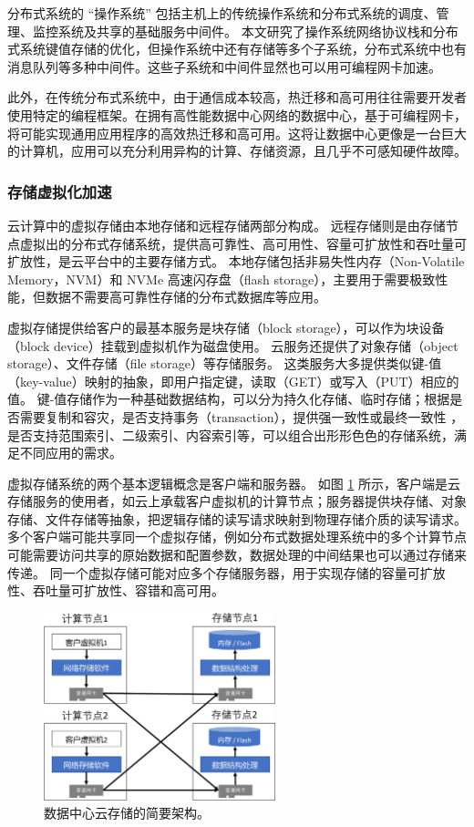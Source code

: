 分布式系统的 ``操作系统'' 包括主机上的传统操作系统和分布式系统的调度、管理、监控系统及共享的基础服务中间件。
本文研究了操作系统网络协议栈和分布式系统键值存储的优化，但操作系统中还有存储等多个子系统，分布式系统中也有消息队列等多种中间件。这些子系统和中间件显然也可以用可编程网卡加速。

此外，在传统分布式系统中，由于通信成本较高，热迁移和高可用往往需要开发者使用特定的编程框架。在拥有高性能数据中心网络的数据中心，基于可编程网卡，将可能实现通用应用程序的高效热迁移和高可用。这将让数据中心更像是一台巨大的计算机，应用可以充分利用异构的计算、存储资源，且几乎不可感知硬件故障。

\subsubsection{存储虚拟化加速}
\label{future:storage-virtualization}

云计算中的虚拟存储由本地存储和远程存储两部分构成。
远程存储则是由存储节点虚拟出的分布式存储系统，提供高可靠性、高可用性、容量可扩放性和吞吐量可扩放性，是云平台中的主要存储方式。
本地存储包括非易失性内存（Non-Volatile Memory，NVM）和 NVMe 高速闪存盘（flash storage），主要用于需要极致性能，但数据不需要高可靠性存储的分布式数据库等应用。

虚拟存储提供给客户的最基本服务是块存储（block storage），可以作为块设备（block device）挂载到虚拟机作为磁盘使用。
云服务还提供了对象存储（object storage）、文件存储（file storage）等存储服务。
这类服务大多提供类似键-值（key-value）映射的抽象，即用户指定键，读取（GET）或写入（PUT）相应的值。
键-值存储作为一种基础数据结构，可以分为持久化存储、临时存储；根据是否需要复制和容灾，是否支持事务（transaction），提供强一致性或最终一致性 \cite{anna}，是否支持范围索引、二级索引、内容索引等，可以组合出形形色色的存储系统，满足不同应用的需求。

虚拟存储系统的两个基本逻辑概念是客户端和服务器。
如图 \ref{background:fig:storage_arch} 所示，客户端是云存储服务的使用者，如云上承载客户虚拟机的计算节点；服务器提供块存储、对象存储、文件存储等抽象，把逻辑存储的读写请求映射到物理存储介质的读写请求。
多个客户端可能共享同一个虚拟存储，例如分布式数据处理系统中的多个计算节点可能需要访问共享的原始数据和配置参数，数据处理的中间结果也可以通过存储来传递。
同一个虚拟存储可能对应多个存储服务器，用于实现存储的容量可扩放性、吞吐量可扩放性、容错和高可用。


\begin{figure}[htbp]
	\centering
	\includegraphics[width=0.6\textwidth]{figures/storage_arch.pdf}
	\caption{数据中心云存储的简要架构。}
	\label{background:fig:storage_arch}
\end{figure}


